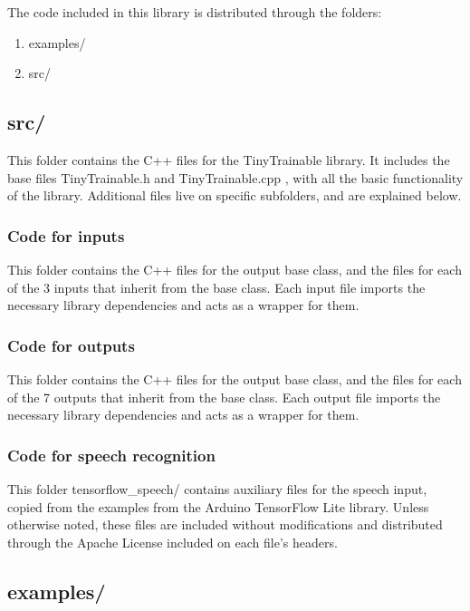 The code included in this library is distributed through the folders:

\begin{enumerate}
  \item examples/
  \item src/
\end{enumerate}

\subsection{src/}

This folder contains the C++ files for the TinyTrainable library. It includes the base files TinyTrainable.h and TinyTrainable.cpp , with all the basic functionality of the library. Additional files live on specific subfolders, and are explained below.

\subsubsection{Code for inputs}

This folder contains the C++ files for the output base class, and the files for each of the 3 inputs that inherit from the base class. Each input file imports the necessary library dependencies and acts as a wrapper for them.

\subsubsection{Code for outputs}

This folder contains the C++ files for the output base class, and the files for each of the 7 outputs that inherit from the base class. Each output file imports the necessary library dependencies and acts as a wrapper for them.

\subsubsection{Code for speech recognition}

This folder tensorflow{\_}speech/ contains auxiliary files for the speech input, copied from the examples from the Arduino TensorFlow Lite library. Unless otherwise noted, these files are included without modifications and distributed through the Apache License included on each file's headers.

\subsection{examples/}

